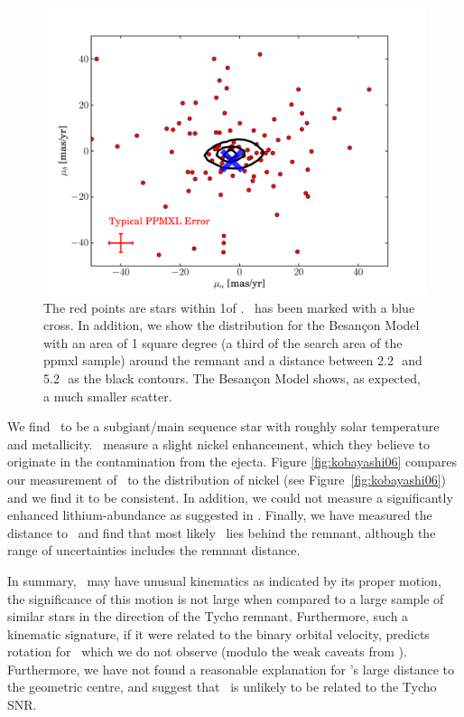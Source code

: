 \begin{figure}[tb] %
   \centering
   \includegraphics[width=\textwidth, trim=0 0 2cm 0, clip]{chapter_sn1572_hires/plots/ppmxl_besancon_plot.pdf} 
   \caption[Comparison between PPMXL catalog and the Besan\c{c}on Model]{The red points are  stars within 1\degree of . \starg\ has been marked with a blue cross. In addition, we show the distribution for the Besan\c{c}on Model with an area of 1 square degree (a third of the search area of the \gls{ppmxl} sample) around the remnant and a distance between 2.2\,\kpc\ and  5.2\,\kpc\ as the black contours. The Besan\c{c}on Model shows, as expected, a much smaller scatter. }
   \label{fig:sn1572_hires:ppmxl_compare}
\end{figure}
We find \starg\ to be a subgiant/main sequence star with roughly solar temperature and metallicity.
\gh\ measure a slight nickel enhancement, which they believe to originate in the contamination from the ejecta. Figure \ref{fig:kobayashi06} compares our measurement of \starg\ to the distribution of nickel (see Figure~\ref{fig:kobayashi06}) and we find it to be consistent. In addition, we could not measure a significantly enhanced lithium-abundance as suggested in \gh. 
Finally, we have measured the distance to \starg\ and find that most likely \starg\ lies behind the remnant, although the range of uncertainties includes the remnant distance. 

In summary, \starg\ may have unusual kinematics as indicated by its proper motion, the significance of this motion is not large when compared to a large sample of similar stars in the direction of the Tycho remnant. Furthermore, such a kinematic signature, if it were related to the binary orbital velocity, predicts rotation for \starg\ which we do not observe (modulo the weak caveats from \wek). Furthermore, we have not  found a reasonable explanation for \starg's large distance to the geometric centre, and suggest that \starg\ is unlikely to be related to the Tycho SNR.


